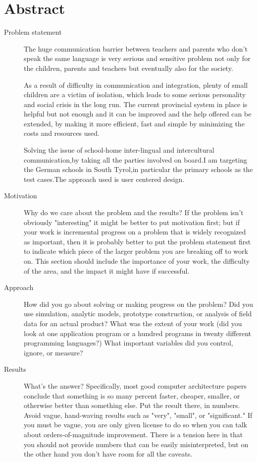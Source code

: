 \chapter*{Abstract}

\begin{description}

  \item[Problem statement] The huge communication barrier between
  teachers and parents who don't speak the same language is very serious
  and sensitive problem not only for the children, parents and teachers 
  but eventually also for the society. 

  As a result of difficulty in communication and integration, plenty of
  small children are a victim of isolation, which leads to some serious 
  personality and social crisis in the long run. 
  The current provincial system in place is helpful but not enough and 
  it can be improved and the help offered can be extended, by making it
  more efficient, fast and simple by minimizing the costs and resources 
  used. 
  
  Solving the issue of school-home inter-lingual and intercultural
  communication,by taking all the parties involved on board.I am targeting
  the German schools in South Tyrol,in particular the primary schools as the
  test cases.The approach used is user centered design.

  \item[Motivation] Why do we care about the problem and the results?
  If the problem isn't obviously "interesting" it might be better to put
  motivation first; but if your work is incremental progress on a problem that
  is widely recognized as important, then it is probably better to put the
  problem statement first to indicate which piece of the larger problem you are
  breaking off to work on. This section should include the importance of your
  work, the difficulty of the area, and the impact it might have if successful.

  \item[Approach] How did you go about solving or making progress on
  the problem? Did you use simulation, analytic models, prototype construction,
  or analysis of field data for an actual product? What was the extent of your
  work (did you look at one application program or a hundred programs in twenty
  different programming languages?) What important variables did you control,
  ignore, or measure?

  \item[Results] What's the answer? Specifically, most good computer
  architecture papers conclude that something is so many percent faster,
  cheaper, smaller, or otherwise better than something else. Put the result
  there, in numbers. Avoid vague, hand-waving results such as "very", "small",
  or "significant." If you must be vague, you are only given license to do so
  when you can talk about orders-of-magnitude improvement. There is a tension
  here in that you should not provide numbers that can be easily misinterpreted,
  but on the other hand you don't have room for all the caveats.


\end{description}
